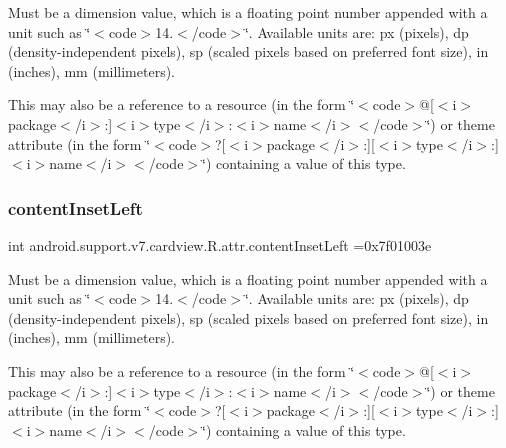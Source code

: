 Must be a dimension value, which is a floating point number appended with a unit such as \char`\"{}$<$code$>$14.\+5sp$<$/code$>$\char`\"{}. Available units are\+: px (pixels), dp (density-\/independent pixels), sp (scaled pixels based on preferred font size), in (inches), mm (millimeters). 

This may also be a reference to a resource (in the form \char`\"{}$<$code$>$@\mbox{[}$<$i$>$package$<$/i$>$\+:\mbox{]}$<$i$>$type$<$/i$>$\+:$<$i$>$name$<$/i$>$$<$/code$>$\char`\"{}) or theme attribute (in the form \char`\"{}$<$code$>$?\mbox{[}$<$i$>$package$<$/i$>$\+:\mbox{]}\mbox{[}$<$i$>$type$<$/i$>$\+:\mbox{]}$<$i$>$name$<$/i$>$$<$/code$>$\char`\"{}) containing a value of this type. \mbox{\label{classandroid_1_1support_1_1v7_1_1cardview_1_1R_1_1attr_ac9a3713dc1e40a5608dcb7bf6b36f4a7}} 
\subsubsection{\texorpdfstring{content\+Inset\+Left}{contentInsetLeft}}
{\footnotesize\ttfamily int android.\+support.\+v7.\+cardview.\+R.\+attr.\+content\+Inset\+Left =0x7f01003e\hspace{0.3cm}{\ttfamily [static]}}

Must be a dimension value, which is a floating point number appended with a unit such as \char`\"{}$<$code$>$14.\+5sp$<$/code$>$\char`\"{}. Available units are\+: px (pixels), dp (density-\/independent pixels), sp (scaled pixels based on preferred font size), in (inches), mm (millimeters). 

This may also be a reference to a resource (in the form \char`\"{}$<$code$>$@\mbox{[}$<$i$>$package$<$/i$>$\+:\mbox{]}$<$i$>$type$<$/i$>$\+:$<$i$>$name$<$/i$>$$<$/code$>$\char`\"{}) or theme attribute (in the form \char`\"{}$<$code$>$?\mbox{[}$<$i$>$package$<$/i$>$\+:\mbox{]}\mbox{[}$<$i$>$type$<$/i$>$\+:\mbox{]}$<$i$>$name$<$/i$>$$<$/code$>$\char`\"{}) containing a value of this type. \mbox{\label{classandroid_1_1support_1_1v7_1_1cardview_1_1R_1_1attr_a521bca396b0fb2722f7dda4656f2d45c}} 
